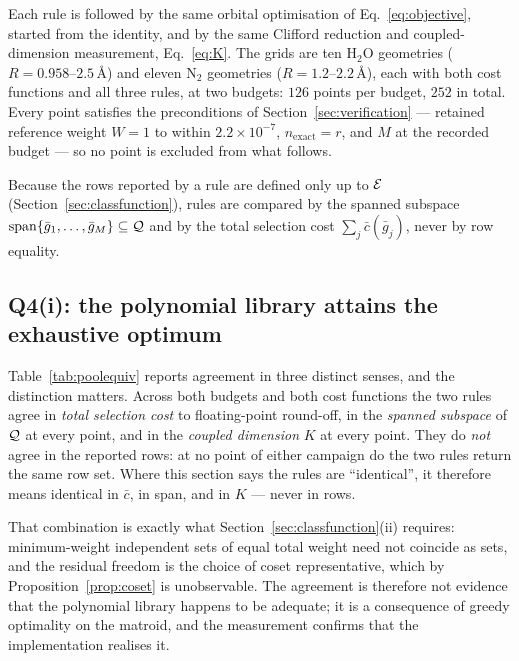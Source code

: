 Each rule is followed by the same orbital optimisation of
Eq.~\eqref{eq:objective}, started from the identity, and by the same Clifford
reduction and coupled-dimension measurement, Eq.~\eqref{eq:K}. The grids are
ten $\mathrm{H_2O}$ geometries
($R=0.958$--$2.5$\,\AA) and eleven $\mathrm{N_2}$ geometries ($R=1.2$--$2.2$\,\AA),
each with both cost functions and all three rules, at two budgets: $126$
points per budget, $252$ in total. Every point satisfies the preconditions of
Section~\ref{sec:verification} --- retained reference weight $W=1$ to within
$2.2\times10^{-7}$, $n_{\mathrm{exact}}=r$, and $M$ at the recorded budget ---
so no point is excluded from what follows.

Because the rows reported by a rule are defined only up to $\mathcal E$
(Section~\ref{sec:classfunction}), rules are compared by the spanned subspace
$\operatorname{span}\{\bar g_1,\dots,\bar g_M\}\subseteq\mathcal Q$ and by the total
selection cost $\sum_j \bar c(\bar g_j)$, never by row equality.

\subsection{Q4(i): the polynomial library attains the exhaustive optimum}

\begin{table}[htbp]
\centering

\caption{Agreement between the polynomial (iterative) and exhaustive rules.
``points'' counts geometries at the stated budget and cost function;
$\Delta c=\sum_j\bar c(\bar g_j)$ differs between the two rules;
``span agree'' counts points at which
$\operatorname{span}\{\bar g_j\}$ coincides; ``$K$ agree'' counts points at
which the coupled dimension coincides. Row sets never coincide.}
\label{tab:poolequiv}
\end{table}

Table~\ref{tab:poolequiv} reports agreement in three distinct senses, and the
distinction matters. Across both budgets and both cost functions the two rules
agree in \emph{total selection cost} to floating-point round-off, in the
\emph{spanned subspace} of $\mathcal Q$ at every point, and in the \emph{coupled
dimension} $K$ at every point. They do \emph{not} agree in the reported rows:
at no point of either campaign do the two rules return the same row set. Where
this section says the rules are ``identical'', it therefore means identical in
$\bar c$, in span, and in $K$ --- never in rows.

That combination is exactly what Section~\ref{sec:classfunction}(ii) requires:
minimum-weight independent sets of equal total weight need not coincide as
sets, and the residual freedom is the choice of coset representative, which by
Proposition~\ref{prop:coset} is unobservable. The agreement is therefore not
evidence that the polynomial library happens to be adequate; it is a
consequence of greedy optimality on the matroid, and the measurement confirms
that the implementation realises it.

